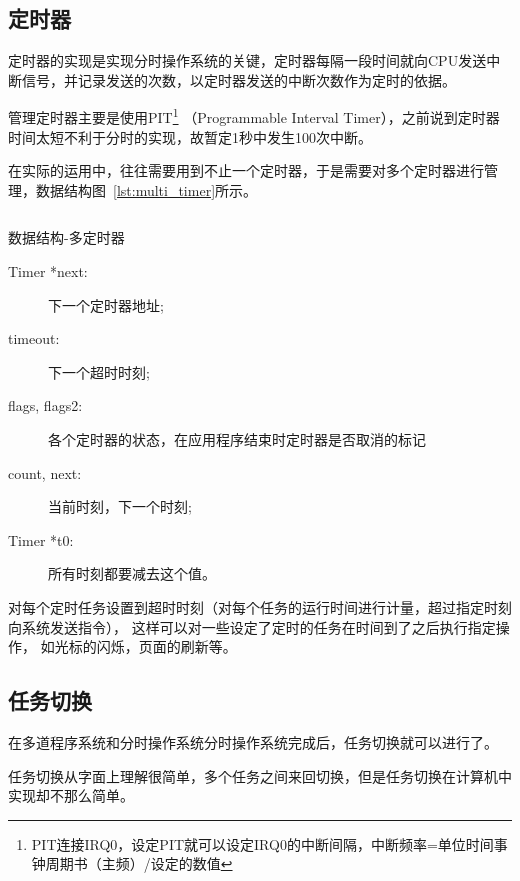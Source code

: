 \subsection{定时器}

定时器的实现是实现分时操作系统的关键，定时器每隔一段时间就向CPU发送中断信号，并记录发送的次数，以定时器发送的中断次数作为定时的依据。

管理定时器主要是使用PIT\footnote{PIT连接IRQ0，设定PIT就可以设定IRQ0的中断间隔，中断频率=单位时间事钟周期书（主频）/设定的数值}
（Programmable Interval Timer），之前说到定时器时间太短不利于分时的实现，故暂定1秒中发生100次中断。

在实际的运用中，往往需要用到不止一个定时器，于是需要对多个定时器进行管理，数据结构图~\ref{lst:multi_timer}所示。

\begin{listing}[H]
  \inputminted[tabsize=2, firstline=175, lastline=187,
    linenos=true]{c}{../ZOS/src/kernel/bootpack.h}
  \caption{数据结构-多定时器}
  \label{lst:multi_timer}
\end{listing}

\begin{description}
\item[Timer *next:]下一个定时器地址;
\item[timeout:]下一个超时时刻;
\item[flags, flags2:]各个定时器的状态，在应用程序结束时定时器是否取消的标记
\item[count, next:]当前时刻，下一个时刻;
\item[Timer *t0:]所有时刻都要减去这个值。
\end{description}

对每个定时任务设置到超时时刻（对每个任务的运行时间进行计量，超过指定时刻向系统发送指令），
这样可以对一些设定了定时的任务在时间到了之后执行指定操作，
如光标的闪烁，页面的刷新等。

\subsection{任务切换}

在多道程序系统和分时操作系统分时操作系统完成后，任务切换就可以进行了。

任务切换从字面上理解很简单，多个任务之间来回切换，但是任务切换在计算机中实现却不那么简单。

